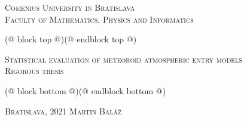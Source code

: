 \begin{titlepage}
    \begin{center}
        {
            \Large
            \textsc{Comenius University in Bratislava}\\[2mm]
            \textsc{Faculty of Mathematics, Physics and Informatics}\\[12mm]
        }

        (@ block top @)(@ endblock top @)

        {
            \linespread{1.2}
            \fontsize{30}{30}\selectfont
            \textsc{Statistical evaluation of meteoroid atmospheric entry models}\\[10mm]

            \large
            \textsc{Rigorous thesis}
        }

        (@ block bottom @)(@ endblock bottom @)

        \vfill
        {
            \large
            \textsc{Bratislava}, 2021 \hfill \textsc{Martin Baláž}
        }
    \end{center}
\end{titlepage}
